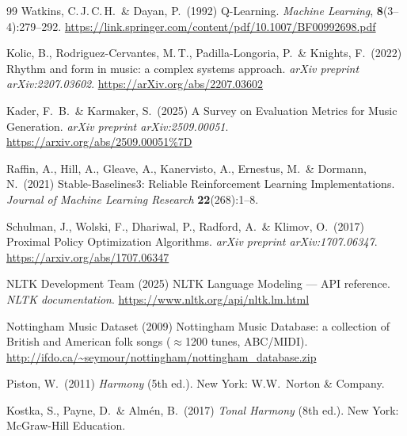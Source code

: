 \documentclass{article}
\begin{document}
\begin{thebibliography}{99}
  Watkins, C.\,J.\,C.\,H.\ \& Dayan, P.\ (1992)
  Q-Learning.
  {\it Machine Learning}, {\bf 8}(3--4):279--292.
  \url{https://link.springer.com/content/pdf/10.1007/BF00992698.pdf}

  Kolic, B., Rodriguez-Cervantes, M.\,T., Padilla-Longoria, P.\ \& Knights, F.\ (2022)
  Rhythm and form in music: a complex systems approach.
  {\it arXiv preprint arXiv:2207.03602}.
  \url{https://arXiv.org/abs/2207.03602}

  Kader, F.~B.\ \& Karmaker, S.\ (2025)
  A Survey on Evaluation Metrics for Music Generation.
  {\it arXiv preprint arXiv:2509.00051}.
  \url{https://arxiv.org/abs/2509.00051%7D}

  Raffin, A., Hill, A., Gleave, A., Kanervisto, A., Ernestus, M.\ \& Dormann, N.\ (2021)
  Stable-Baselines3: Reliable Reinforcement Learning Implementations.
  {\it Journal of Machine Learning Research} {\bf 22}(268):1--8.

  Schulman, J., Wolski, F., Dhariwal, P., Radford, A.\ \& Klimov, O.\ (2017)
  Proximal Policy Optimization Algorithms.
  {\it arXiv preprint arXiv:1707.06347}.
  \url{https://arxiv.org/abs/1707.06347}

  NLTK Development Team (2025)
  NLTK Language Modeling — API reference.
  \textit{NLTK documentation}.
  \url{https://www.nltk.org/api/nltk.lm.html}

  Nottingham Music Dataset (2009)
  Nottingham Music Database: a collection of British and American folk songs ($\approx$1200 tunes, ABC/MIDI).
  \url{http://ifdo.ca/~seymour/nottingham/nottingham_database.zip}

  Piston, W.\ (2011)
  {\it Harmony} (5th ed.).
  New York: W.W.\ Norton \& Company.
  
  Kostka, S., Payne, D.\ \& Almén, B.\ (2017)
  {\it Tonal Harmony} (8th ed.).
  New York: McGraw-Hill Education.
  
\end{thebibliography}
\end{document}
